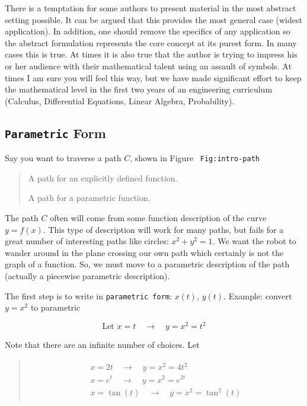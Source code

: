 There is a temptation for some authors to present material in the most
abstract setting possible. It can be argued that this provides the most
general case (widest application). In addition, one should remove the
specifics of any application so the abstract formulation represents the
core concept at its purest form. In many cases this is true. At times it
is also true that the author is trying to impress his or her audience
with their mathematical talent using an assault of symbols. At times I
am sure you will feel this way, but we have made significant effort to
keep the mathematical level in the first two years of an engineering
curriculum (Calculus, Differential Equations, Linear Algebra,
Probability).

\hypertarget{parametric-form}{%
\subsection{\texorpdfstring{\texttt{Parametric}
Form}{Parametric Form}}\label{parametric-form}}

Say you want to traverse a path \(C\), shown in Figure~
\texttt{Fig:intro-path}

\begin{quote}
A path for an explicitly defined function.

A path for a parametric function.
\end{quote}

The path \(C\) often will come from some function description of the
curve \(y = f(x)\). This type of description will work for many paths,
but fails for a great number of interesting paths like circles:
\(x^2 + y^2 = 1\). We want the robot to wander around in the plane
crossing our own path which certainly is not the graph of a function.
So, we must move to a parametric description of the path (actually a
piecewise parametric description).

The first step is to write in \texttt{parametric\ form}: \(x(t)\),
\(y(t)\). Example: convert \(y=x^2\) to parametric

\[\mbox{Let } x = t  \quad \to \quad y = x^2 = t^2\]

Note that there are an infinite number of choices. Let

\begin{quote}
\[\begin{aligned}
\begin{array}{l}
x = 2t  \quad \to \quad y = x^2 = 4t^2 \\
x = e^t  \quad  \to \quad y = x^2 = e^{2t} \\
x = \tan(t) \quad \to \quad y = x^2 = \tan^2(t)
\end{array}
\end{aligned}\]
\end{quote}

